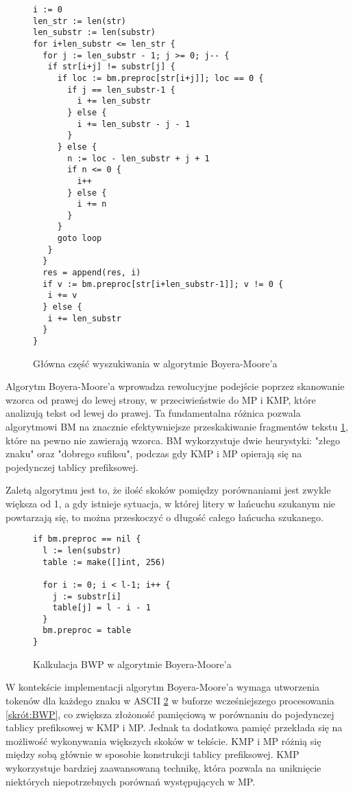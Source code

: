 \begin{figure}[ht]
    \centering
    \begin{lstlisting}
i := 0
len_str := len(str)
len_substr := len(substr)
for i+len_substr <= len_str {
  for j := len_substr - 1; j >= 0; j-- {
   if str[i+j] != substr[j] {
     if loc := bm.preproc[str[i+j]]; loc == 0 {
       if j == len_substr-1 {
         i += len_substr
       } else {
         i += len_substr - j - 1
       }
     } else {
       n := loc - len_substr + j + 1
       if n <= 0 {
         i++
       } else {
         i += n
       }
     }
     goto loop
   }
  }
  res = append(res, i)
  if v := bm.preproc[str[i+len_substr-1]]; v != 0 {
   i += v
  } else {
   i += len_substr
  }
}
    \end{lstlisting}
    \caption{Główna część wyszukiwania w algorytmie Boyera-Moore'a}
    \label{fig:code:BMmain}
\end{figure}
  

  


Algorytm Boyera-Moore'a wprowadza rewolucyjne podejście poprzez skanowanie 
wzorca od prawej do lewej strony, w przeciwieństwie do MP i KMP, które 
analizują tekst od lewej do prawej. Ta fundamentalna różnica pozwala algorytmowi BM na 
znacznie efektywniejsze przeskakiwanie fragmentów tekstu \ref{fig:code:BMmain}, które na pewno nie 
zawierają wzorca. BM wykorzystuje dwie heurystyki: "złego znaku" oraz "dobrego
sufiksu", podczas gdy KMP i MP opierają się na pojedynczej tablicy prefiksowej.

Zaletą algorytmu jest to, że ilość skoków pomiędzy porównaniami jest zwykle 
większa od 1, a gdy istnieje sytuacja, w której litery w łańcuchu szukanym nie
powtarzają się, to można przeskoczyć o długość całego łańcucha szukanego.

\begin{figure}[ht]
    \centering
    \begin{lstlisting}
if bm.preproc == nil {
  l := len(substr)
  table := make([]int, 256)

  for i := 0; i < l-1; i++ {
    j := substr[i]
    table[j] = l - i - 1
  }
  bm.preproc = table
}
    \end{lstlisting}
    \caption{Kalkulacja BWP w algorytmie Boyera-Moore'a}
    \label{fig:code:BMpreproc}
\end{figure}

W kontekście implementacji algorytm Boyera-Moore'a wymaga utworzenia tokenów dla
każdego znaku w ASCII \ref{fig:code:BMpreproc} w buforze wcześniejszego 
procesowania \ref{skrót:BWP}, co zwiększa złożoność pamięciową w porównaniu do pojedynczej 
tablicy prefiksowej w KMP i MP. Jednak ta dodatkowa pamięć przekłada się na 
możliwość wykonywania większych skoków w tekście. KMP i MP różnią się między 
sobą głównie w sposobie konstrukcji tablicy prefiksowej. KMP wykorzystuje 
bardziej zaawansowaną technikę, która pozwala na uniknięcie niektórych 
niepotrzebnych porównań występujących w MP.

